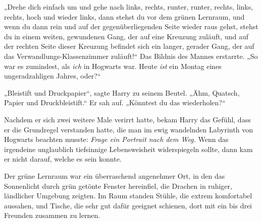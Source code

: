 „Drehe dich einfach um und gehe nach links, rechts, runter, runter, rechts, links, rechts, hoch und wieder links, dann stehst du vor dem grünen Lernraum, und wenn du dann rein und auf der gegenüberliegenden Seite wieder raus gehst, stehst du in einem weiten, gewundenen Gang, der auf eine Kreuzung zuläuft, und auf der rechten Seite dieser Kreuzung befindet sich ein langer, gerader Gang, der auf das Verwandlungs-Klassenzimmer zuläuft!“ Das Bildnis des Mannes erstarrte.
„So war es zumindest, als \emph{ich} in Hogwarts war. Heute \emph{ist} ein Montag eines ungeradzahligen Jahres, oder?“%

„Bleistift und Druckpapier“, sagte Harry zu seinem Beutel. „Ähm, Quatsch, Papier und Druckbleistift.“ Er sah auf.
„Könntest du das wiederholen?“

Nachdem er sich zwei weitere Male verirrt hatte, bekam Harry das Gefühl, dass er die Grundregel verstanden hatte, die man im ewig wandelnden Labyrinth von Hogwarts beachten musste: \emph{Frage ein Portrait nach dem Weg.} Wenn das irgendeine unglaublich tiefsinnige Lebensweisheit widerspiegeln sollte, dann kam er nicht darauf, welche es sein konnte.

Der grüne Lernraum war ein überraschend angenehmer Ort, in den das Sonnenlicht durch grün getönte Fenster hereinfiel, die Drachen in ruhiger, ländlicher Umgebung zeigten. Im Raum standen Stühle, die extrem komfortabel aussahen, und Tische, die sehr gut dafür geeignet schienen, dort mit ein bis drei Freunden zusammen zu lernen.

